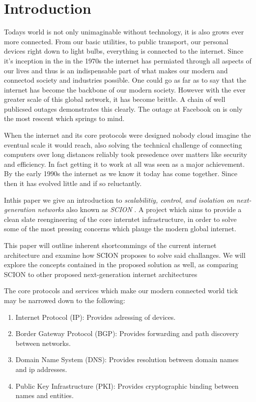 \documentclass[../eva1_scion.tex]{subfiles}
\begin{document}
\chapter{Introduction}\label{ch:introduction}
\setcounter{page}{1}
Todays world is not only unimaginable without technology, it is also grows ever more connected. From our basic utilities, to public transport, our personal devices right down to light bulbs, everything is connected to the internet. Since it's inception in the in the 1970s the internet has permiated through all aspects of our lives and thus is an indispensable part of what makes our modern and connectod society and industries possible. One could go as far as to say that the internet has become the backbone of our modern society. However with the ever greater scale of this global network, it has become brittle. A chain of well publicsed outages demonstrates this clearly. The outage at Facebook on  is only the most rescent which springs to mind.

When the internet and its core protocols were designed nobody cloud imagine the eventual scale it would reach, also solving the technical challenge of connecting computers over long distances reliably took presedence over matters like security and efficiency. In fact getting it to work at all was seen as a major achievement. By the early 1990s the internet as we know it today has come together. Since then it has evolved little and if so reluctantly.

Inthis paper we give an introduction to \textit{scalabilitiy, control, and isolation on next-generation networks} also known as \textit{ SCION }. A project which aims to provide a clean slate reengineering of the core interntet infrastructure, in order to solve some of the most pressing concerns which plauge the modern global internet.

This paper will outline inherent shortcommings of the current  internet architecture and examine how SCION proposes to solve said challanges. We will explore the concepts contained in the proposed solution as well, as comparing SCION to other proposed next-generation internet architectures 

The core protocols and services which make our modern connected world tick may be narrowed down to the following:

\begin{enumerate}
    \item Internet Protocol (IP): Provides adressing of devices.
    \item Border Gateway Protocol (BGP): Provides forwarding and path discovery between networks.
    \item Domain Name System (DNS): Provides resolution between domain names and ip addresses.
    \item Public Key Infrastructure (PKI): Provides cryptographic binding between names and entities.
\end{enumerate}
\end{document}
